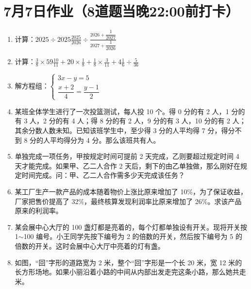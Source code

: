 \documentclass[UTF8,12pt,a4paper]{ctexart}
\newcommand{\BottomWriteSpace}{0.5cm}
\newenvironment{OnePageEightFill}{
  \small
  \vspace*{0pt}
  \begin{enumerate}[leftmargin=*, itemsep=0pt, topsep=0pt, parsep=0pt, partopsep=0pt]
  \setlength{\parskip}{0pt}
}{
  \end{enumerate}
  \vspace*{\BottomWriteSpace}
  \normalsize
  \newpage
}
\newcommand{\Q}[1]{\item #1\par\vfill}
\newcommand{\Qlast}[1]{\item #1\par}
\begin{document}
\section*{7月7日作业（8道题当晚22:00前打卡）}
\begin{OnePageEightFill}

\Q{计算：$\displaystyle 2025 \div 2025\frac{2025}{2026} \div \frac{2026 + \dfrac{1}{2027}}{2027 + \dfrac{1}{2026}}$}

\Q{计算：$\displaystyle \frac{3}{8} \times 59\frac{10}{11} + 20 \times \frac{1}{8} + \frac{1}{8} \times \frac{3}{11} + 4\frac{1}{6} \div \frac{5}{36}$}

\Q{解方程组：$\begin{cases} 3x - y = 5 \\ \dfrac{x+2}{4} = \dfrac{y-1}{2} \end{cases}$}

\Q{某班全体学生进行了一次投篮测试，每人投 10 个。得 0 分的有 2 人，1 分的有 3 人，2 分的有 4 人；得 8 分的有 2 人，9 分的有 3 人，10 分的有 2 人；其余分数人数未知。已知该班学生中，至少得 3 分的人平均得 7 分，得分不到 8 分的人平均得分为 4 分。那么该班共有\underline{\hspace{3em}}人。}

\Q{单独完成一项任务，甲按规定时间可提前 2 天完成，乙则要超过规定时间 4 天才能完成。如果甲、乙二人合作 2 天后，剩下的由乙单独做，那么刚好在规定时间完成。问：甲、乙二人合作需多少天完成该任务？}

\Q{某工厂生产一款产品的成本随着物价上涨比原来增加了 10\%，为了保证收益，厂家把售价提高了 32\%，最终核算发现利润率比原来增加了 26\%。求该产品原来的利润率。}

\Q{某会展中心大厅的 100 盏灯都是亮着的，每个灯都单独设有开关。现将开关按 1$\sim$100 编号。小王同学先按下编号为 2 的倍数的开关，然后按下编号为 5 的倍数的开关。这时会展中心大厅中亮着的灯有\underline{\hspace{3em}}盏。}

\Qlast{如图，“回”字形的道路宽为 2 米，整个“回”字形是一个长 20 米，宽 12 米的长方形场地。如果小丽沿着小路的中间从内部出发走完这条小路，那么她共走\underline{\hspace{3em}}米。}

\end{OnePageEightFill}

\end{document}
